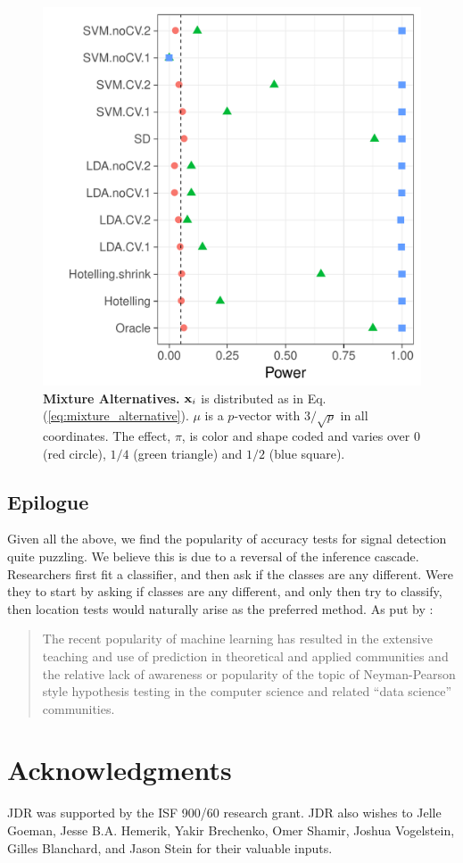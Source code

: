 \documentclass[12pt,a4paper]{article}
\begin{document}
\begin{figure}[ht]
\centering
	  \includegraphics[width=0.5\linewidth]{"art/file12"}
	  \caption{\textbf{Mixture Alternatives.} $\mathbf{x}_i$ is distributed as in Eq.(\ref{eq:mixture_alternative}). 
	  	$\mu$ is a $p$-vector with $3/\sqrt{p}$ in all coordinates.
	  The effect, $\pi$, is color and shape coded and varies over $0$ (red circle), $1/4$ (green triangle) and $1/2$ (blue square). }
	\label{fig:golland}
\end{figure}




\subsection{Epilogue}
Given all the above, we find the popularity of accuracy tests for signal detection quite puzzling. 
We believe this is due to a reversal of the inference cascade. 
Researchers first fit a classifier, and then ask if the classes are any different.
Were they to start by asking if classes are any different, and only then try to classify, then location tests would naturally arise as the preferred method. 
As put by \cite{ramdas_classification_2016}:
\begin{quote}
The recent popularity of machine learning has resulted in the extensive teaching and use
of prediction in theoretical and applied communities and the relative lack of awareness or
popularity of the topic of Neyman-Pearson style hypothesis testing in the computer science
and related ``data science'' communities.
\end{quote}






\section{Acknowledgments}
JDR was supported by the ISF 900/60 research grant. 
JDR also wishes to Jelle Goeman, Jesse B.A. Hemerik, Yakir Brechenko, Omer Shamir, Joshua Vogelstein, Gilles Blanchard, and Jason Stein for their valuable inputs. 
\end{document}
